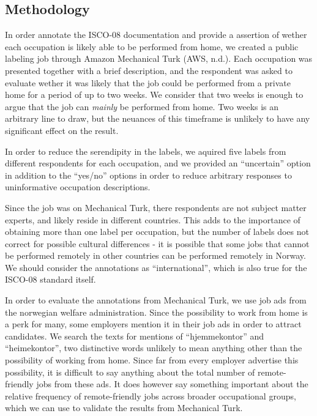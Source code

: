 \documentclass[]{article}
\begin{document}
\hypertarget{methodology}{%
\subsection{Methodology}\label{methodology}}

In order annotate the ISCO-08 documentation and provide a assertion of
wether each occupation is likely able to be performed from home, we
created a public labeling job through Amazon Mechanical Turk (AWS,
n.d.). Each occupation was presented together with a brief description,
and the respondent was asked to evaluate wether it was likely that the
job could be performed from a private home for a period of up to two
weeks. We consider that two weeks is enough to argue that the job can
\emph{mainly} be performed from home. Two weeks is an arbitrary line to
draw, but the neuances of this timeframe is unlikely to have any
significant effect on the result.

In order to reduce the serendipity in the labels, we aquired five labels
from different respondents for each occupation, and we provided an
``uncertain'' option in addition to the ``yes/no'' options in order to
reduce arbitrary responses to uninformative occupation descriptions.

Since the job was on Mechanical Turk, there respondents are not subject
matter experts, and likely reside in different countries. This adds to
the importance of obtaining more than one label per occupation, but the
number of labels does not correct for possible cultural differences - it
is possible that some jobs that cannot be performed remotely in other
countries can be performed remotely in Norway. We should consider the
annotations as ``international'', which is also true for the ISCO-08
standard itself.

In order to evaluate the annotations from Mechanical Turk, we use job
ads from the norwegian welfare administration. Since the possibility to
work from home is a perk for many, some employers mention it in their
job ads in order to attract candidates. We search the texts for mentions
of ``hjemmekontor'' and ``heimekontor'', two distinctive words unlikely
to mean anything other than the possibility of working from home. Since
far from every employer advertise this possibility, it is difficult to
say anything about the total number of remote-friendly jobs from these
ads. It does however say something important about the relative
frequency of remote-friendly jobs across broader occupational groups,
which we can use to validate the results from Mechanical Turk.
\end{document}
